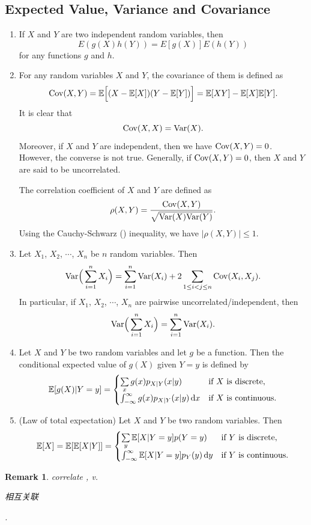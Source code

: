 \documentclass[12pt,letterpaper, onecolumn]{exam}
\newtheorem{remark}{Remark}
\begin{document}
    \subsection{Expected Value, Variance and Covariance}
    \begin{enumerate}
        \item If $X$ and $Y$ are two independent random variables, then 
        $$E(g(X)h(Y))=E[g(X)]E(h(Y))$$
        for any functions $g$ and $h$.
        \item For any random variables $X$ and $Y$, the covariance of them is defined as 
        $${\rm{Cov}}(X,Y)=\mathbb{E}\Big[(X-\mathbb{E}[X])(Y-\mathbb{E}[Y])\Big]=\mathbb{E}[XY]-\mathbb{E}[X]\mathbb{E}[Y].$$
        It is clear that 
        $${\rm{Cov}}(X,X)={\rm{Var}}(X).$$
        Moreover, if $X$ and $Y$ are independent, then we have ${\rm{Cov}}(X,Y)=0$. However, the converse is not true. Generally, if ${\rm{Cov}}(X,Y)=0$, then $X$ and $Y$ are said to be uncorrelated.

        The correlation coefficient of $X$ and $Y$ are defined as 
        $$\rho(X,Y)=\frac{{\rm{Cov}}(X,Y)}{\sqrt{{\rm{Var}}(X){\rm{Var}}(Y)}}.$$
        Using the Cauchy-Schwarz () inequality, we have $|\rho(X,Y)|\le 1$.
        \item Let $X_1$, $X_2$, $\cdots$, $X_n$ be $n$ random variables. Then 
        $${\rm{Var}}\Big(\sum_{i=1}^nX_i\Big)=\sum_{i=1}^n{\rm{Var}}(X_i)+2\sum_{1\le i<j\le n}{\rm{Cov}}(X_i,X_j).$$
        In particular, if $X_1$, $X_2$, $\cdots$, $X_n$ are pairwise uncorrelated/independent, then
        $${\rm{Var}}\Big(\sum_{i=1}^nX_i\Big)=\sum_{i=1}^n{\rm{Var}}(X_i).$$
        \item Let $X$ and $Y$ be two random variables and let $g$ be a function. Then the conditional expected value of $g(X)$ given $Y=y$ is defined by 
        $$\mathbb{E}[g(X)|Y=y]=\begin{cases}
            \sum\limits_x g(x)p_{X|Y}(x|y)&\text{if $X$ is discrete},\\
            \int_{-\infty}^{\infty}g(x)p_{X|Y}(x|y)\,{\rm{d}}x&\text{if $X$ is continuous}.
        \end{cases}$$
        \item (Law of total expectation) Let $X$ and $Y$ be two random variables. Then 
        $$\mathbb{E}[X]=\mathbb{E}[\mathbb{E}[X|Y]]=\begin{cases}
            \sum\limits_y\mathbb{E}[X|Y=y]p(Y=y)&\text{if $Y$ is discrete},\\
            \int_{-\infty}^{\infty}\mathbb{E}[X|Y=y]p_Y(y)\,{\rm{d}}y&\text{if $Y$ is continuous}.
        \end{cases}$$
    \end{enumerate}
    \begin{remark}
        correlate , v. \begin{CJK}{UTF8}{gbsn}相互关联\end{CJK}.
    \end{remark}
\end{document}
